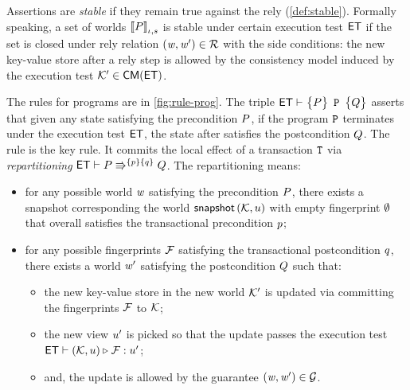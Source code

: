 Assertions are \emph{stable} if they remain true against the rely (\cref{def:stable}).
Formally speaking, a set of worlds \( \left\llbracket P \right\rrbracket_{\iota, s} \) is stable under certain execution test \( \mathsf{ET} \) if the set is closed under rely relation \( (\mathit{w}, \mathit{w}') \in {\mathcal R} \) with the side conditions:
the new key-value store after a rely step is allowed by the consistency model induced by the execution test \( \mkvs' \in \CMs(\ET) \).

The rules for programs are in \cref{fig:rule-prog}.
The triple \( \tripleG{\gpre}{\prog}{\gpost} \) asserts that given any state satisfying the precondition \( P \), if the program \( \mathtt{P} \) terminates under the execution test \( \mathsf{ET} \), the state after satisfies the postcondition \( Q \).
The  rule is the key rule.
It commits the local effect of a transaction \( \mathtt{T} \) via \emph{repartitioning} \( \mathsf{ET} \vdash P \Rrightarrow^{ \left\{ p \right\} \left\{ q \right\} } Q \).
The repartitioning means:
\begin{itemize}
\item
for any possible world \( \mathit{w} \) satisfying the precondition \( P \), there exists a snapshot corresponding the world \( \snapshot[\mkvs, \vi] \) with empty fingerprint \( \emptyset \) that overall satisfies the transactional precondition \( p \);
\item
for any possible fingerprints  \( \mathcal{F} \) satisfying the transactional postcondition \( q \), there exists a world \( \mathit{w}' \) satisfying the postcondition \( Q \) such that:
\begin{itemize}
\item 
the new key-value store in the new world \( \mathcal{K}' \) is updated via committing the fingerprints \( \mathcal{F} \) to \( \mathcal{K} \);
\item
the new view \( u' \) is picked so that the update passes the execution test \( \mathsf{ET} \vdash (\mathcal{K},u) \triangleright_{} \mathcal{F} : u' \);
\item
and, the update is allowed by the guarantee \( (\mathit{w}, \mathit{w}') \in {\mathcal G}\).
\end{itemize}
\end{itemize}


